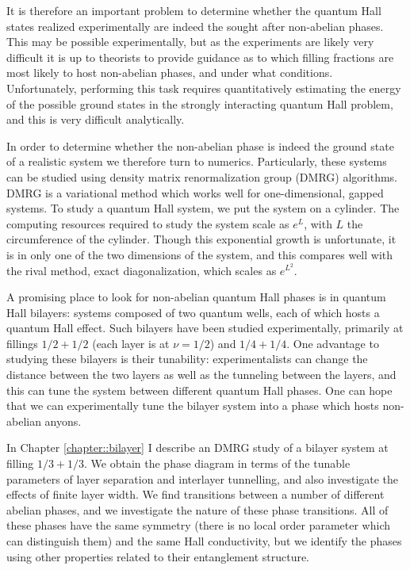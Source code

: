 It is therefore an important problem to determine whether the quantum Hall states realized experimentally are indeed the sought after non-abelian phases. This may be possible experimentally, but as the experiments are likely very difficult it is up to theorists to provide guidance as to which filling fractions are most likely to host non-abelian phases, and under what conditions. Unfortunately, performing this task requires quantitatively estimating the energy of the possible ground states in the strongly interacting quantum Hall problem, and this is very difficult analytically.

In order to determine whether the non-abelian phase is indeed the ground state of a realistic system we therefore turn to numerics. Particularly, these systems can be studied using density matrix renormalization group (DMRG) algorithms\cite{ZaletelQHdmrg13, ZaletelMixing}. DMRG is a variational method which works well for one-dimensional, gapped systems. To study a quantum Hall system, we put the system on a cylinder. The computing resources required to study the system scale as $e^L$, with $L$ the circumference of the cylinder. Though this exponential growth is unfortunate, it is in only one of the two dimensions of the system, and this compares well with the rival method, exact diagonalization, which scales as $e^{L^2}$. 

A promising place to look for non-abelian quantum Hall phases is in quantum Hall bilayers: systems composed of two quantum wells, each of which hosts a quantum Hall effect. Such bilayers have been studied experimentally, primarily at fillings $1/2+1/2$ (each layer is at $\nu=1/2$) and $1/4+1/4$. One advantage to studying these bilayers is their tunability: experimentalists can change the distance between the two layers as well as the tunneling between the layers, and this can tune the system between different quantum Hall phases. One can hope that we can experimentally tune the bilayer system into a phase which hosts non-abelian anyons.

In Chapter \ref{chapter::bilayer} I describe an DMRG study of a bilayer system at filling $1/3+1/3$. We obtain the phase diagram in terms of the tunable parameters of layer separation and interlayer tunnelling, and also investigate the effects of finite layer width. We find transitions between a number of different abelian phases, and we investigate the nature of these phase transitions. All of these phases have the same symmetry (there is no local order parameter which can distinguish them) and the same Hall conductivity, but we identify the phases using other properties related to their entanglement structure.


